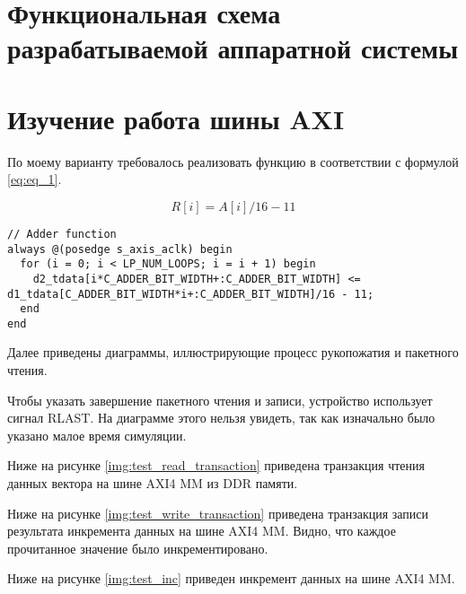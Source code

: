 \setcounter{chapter}{1}

\section{Функциональная схема разрабатываемой аппаратной системы}

\section{Изучение работа шины AXI}

По моему варианту требовалось реализовать функцию в соответствии с формулой \ref{eq:eq_1}.

\begin{equation}
\label{eq:eq_1}
R[i] = A[i]/16 - 11
\end{equation}

\begin{lstlisting}[label=code:adder_func, caption=Изменный код модуля rtl\_kernel\_wizard\_0\_example\_adder.v]
// Adder function
always @(posedge s_axis_aclk) begin
  for (i = 0; i < LP_NUM_LOOPS; i = i + 1) begin
    d2_tdata[i*C_ADDER_BIT_WIDTH+:C_ADDER_BIT_WIDTH] <= d1_tdata[C_ADDER_BIT_WIDTH*i+:C_ADDER_BIT_WIDTH]/16 - 11;
  end
end
\end{lstlisting}

Далее приведены диаграммы, иллюстрирующие процесс рукопожатия и пакетного чтения. 

Чтобы указать завершение пакетного чтения и записи, устройство использует сигнал RLAST. На диаграмме этого нельзя увидеть, так как изначально было указано малое время симуляции.

Ниже на рисунке \ref{img:test_read_transaction} приведена транзакция чтения данных вектора на шине AXI4 MM из DDR памяти.


Ниже на рисунке \ref{img:test_write_transaction} приведена транзакция записи результата инкремента данных на шине AXI4 MM. Видно, что каждое прочитанное значение было инкрементировано.


Ниже на рисунке \ref{img:test_inc} приведен инкремент данных на шине AXI4 MM.


